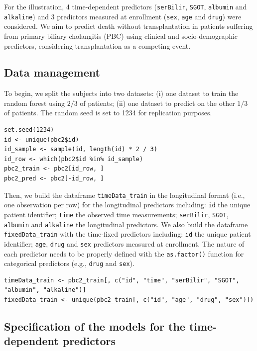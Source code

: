 For the illustration, 4 time-dependent predictors (\texttt{serBilir}, \texttt{SGOT}, \texttt{albumin} and \texttt{alkaline}) and 3 predictors measured at enrollment (\texttt{sex}, \texttt{age} and \texttt{drug}) were considered. We aim to predict death without transplantation in patients suffering from primary biliary cholangitis (PBC) using clinical and socio-demographic predictors, considering transplantation as a competing event.

\subsection{Data management}\label{data-management}

To begin, we split the subjects into two datasets: (i) one dataset to train the random forest using \(2/3\) of patients; (ii) one dataset to predict on the other \(1/3\) of patients. The random seed is set to 1234 for replication purposes.

\begin{verbatim}
set.seed(1234)
id <- unique(pbc2$id)
id_sample <- sample(id, length(id) * 2 / 3)
id_row <- which(pbc2$id %in% id_sample)
pbc2_train <- pbc2[id_row, ]
pbc2_pred <- pbc2[-id_row, ]
\end{verbatim}

Then, we build the dataframe \texttt{timeData\_train} in the longitudinal format (i.e., one observation per row) for the longitudinal predictors including: \texttt{id} the unique patient identifier; \texttt{time} the observed time measurements; \texttt{serBilir}, \texttt{SGOT}, \texttt{albumin} and \texttt{alkaline} the longitudinal predictors. We also build the dataframe \texttt{fixedData\_train} with the time-fixed predictors including: \texttt{id} the unique patient identifier; \texttt{age}, \texttt{drug} and \texttt{sex} predictors measured at enrollment. The nature of each predictor needs to be properly defined with the \texttt{as.factor()} function for categorical predictors (e.g., \texttt{drug} and \texttt{sex}).

\begin{verbatim}
timeData_train <- pbc2_train[, c("id", "time", "serBilir", "SGOT", "albumin", "alkaline")]
fixedData_train <- unique(pbc2_train[, c("id", "age", "drug", "sex")])
\end{verbatim}

\subsection{Specification of the models for the time-dependent predictors}\label{specification-of-the-models-for-the-time-dependent-predictors}

